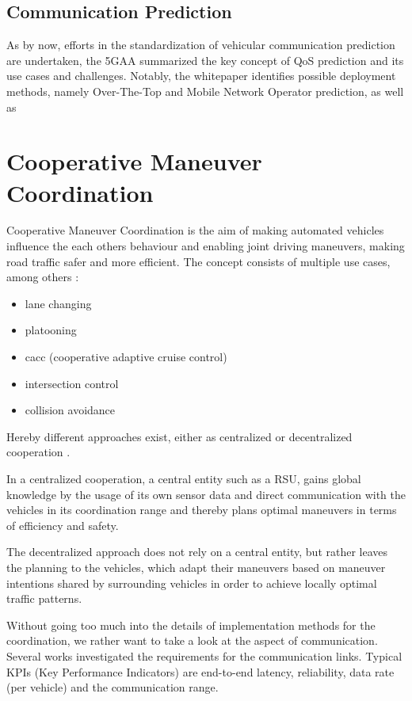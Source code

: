 \documentclass{IEEEtran}
\begin{document}
\subsection{Communication Prediction}
As by now, efforts in the standardization of vehicular communication prediction are undertaken, the 5GAA summarized the key concept of QoS prediction and its use cases and challenges. Notably, the whitepaper identifies possible deployment methods, namely Over-The-Top and Mobile Network Operator prediction, as well as  

\section{Cooperative Maneuver Coordination}
Cooperative Maneuver Coordination is the aim of making automated vehicles influence the each others behaviour and enabling joint driving maneuvers, making road traffic safer and more efficient.
The concept consists of multiple use cases, among others \cite{bobanConnectedRoadsFuture2018}:
\begin{itemize}
\item lane changing
\item platooning
\item cacc (cooperative adaptive cruise control)
\item intersection control
\item collision avoidance
\end{itemize}
Hereby different approaches exist, either as centralized \cite{mengluICTInfrastructureCooperative2018} or decentralized cooperation \cite{llatserCooperativeAutomatedDriving2019,fortelleNetworkAutomatedVehicles2014}.

In a centralized cooperation, a central entity such as a RSU, gains global knowledge by the usage of its own sensor data and direct communication with the vehicles in its coordination range and thereby plans optimal maneuvers in terms of efficiency and safety.

The decentralized approach does not rely on a central entity, but rather leaves the planning to the vehicles, which adapt their maneuvers based on maneuver intentions shared by surrounding vehicles in order to achieve locally optimal traffic patterns.

Without going too much into the details of implementation methods for the coordination, we rather want to take a look at the aspect of communication. Several works investigated the requirements for the communication links. Typical KPIs (Key Performance Indicators) are end-to-end latency, reliability, data rate (per vehicle) and the communication range.
\end{document}
